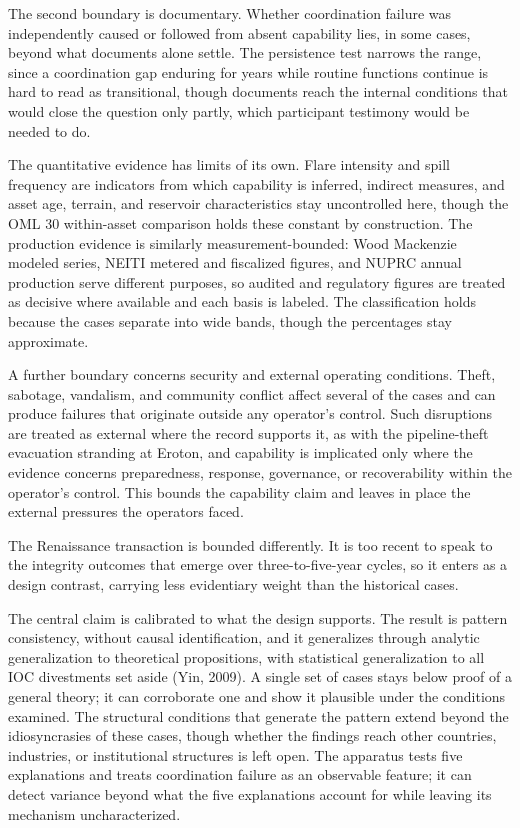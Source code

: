 \documentclass[twoside,fontset=lmodern]{mitthesis}
\begin{document}
The second boundary is documentary. Whether coordination failure was
independently caused or followed from absent capability lies, in some
cases, beyond what documents alone settle. The persistence test narrows
the range, since a coordination gap enduring for years while routine
functions continue is hard to read as transitional, though documents
reach the internal conditions that would close the question only partly,
which participant testimony would be needed to do.

The quantitative evidence has limits of its own. Flare intensity and
spill frequency are indicators from which capability is inferred,
indirect measures, and asset age, terrain, and reservoir characteristics
stay uncontrolled here, though the OML 30 within-asset comparison holds
these constant by construction. The production evidence is similarly
measurement-bounded: Wood Mackenzie modeled series, NEITI metered and
fiscalized figures, and NUPRC annual production serve different
purposes, so audited and regulatory figures are treated as decisive
where available and each basis is labeled. The classification holds
because the cases separate into wide bands, though the percentages stay
approximate.

A further boundary concerns security and external operating conditions.
Theft, sabotage, vandalism, and community conflict affect several of the
cases and can produce failures that originate outside any operator's
control. Such disruptions are treated as external where the record
supports it, as with the pipeline-theft evacuation stranding at Eroton,
and capability is implicated only where the evidence concerns
preparedness, response, governance, or recoverability within the
operator's control. This bounds the capability claim and leaves in place
the external pressures the operators faced.

The Renaissance transaction is bounded differently. It is too recent to
speak to the integrity outcomes that emerge over three-to-five-year
cycles, so it enters as a design contrast, carrying less evidentiary
weight than the historical cases.

The central claim is calibrated to what the design supports. The result
is pattern consistency, without causal identification, and it
generalizes through analytic generalization to theoretical propositions,
with statistical generalization to all IOC divestments set aside (Yin,
2009). A single set of cases stays below proof of a general theory; it
can corroborate one and show it plausible under the conditions examined.
The structural conditions that generate the pattern extend beyond the
idiosyncrasies of these cases, though whether the findings reach other
countries, industries, or institutional structures is left open. The
apparatus tests five explanations and treats coordination failure as an
observable feature; it can detect variance beyond what the five
explanations account for while leaving its mechanism uncharacterized.
\end{document}
